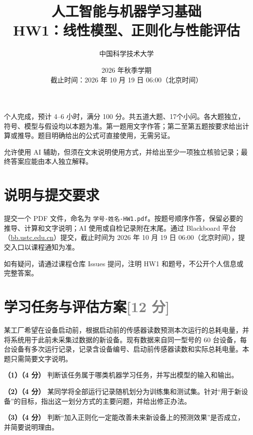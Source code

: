 \documentclass[11pt,a4paper]{article}
\title{\vspace{-0.8cm}\textbf{人工智能与机器学习基础\\HW1：线性模型、正则化与性能评估}}
\author{中国科学技术大学}
\date{2026 年秋季学期\\[0.3em]截止时间：2026 年 10 月 19 日 06:00（北京时间）}
\begin{document}
\maketitle
\thispagestyle{fancy}

\begin{importantbox}
个人完成，预计 4--6 小时，满分 100 分。共五道大题、17个小问。各大题独立，符号、模型与假设均以本题为准。第一题用文字作答；第二至第五题按要求给出计算或推导。题目明确给出的公式可直接使用，无需另证。

\end{importantbox}
允许使用 AI 辅助，但须在文末说明使用方式，并给出至少一项独立核验记录；最终答案应能由本人独立解释。


\section*{说明与提交要求}
提交一个 PDF 文件，命名为 {\small\texttt{学号-姓名-HW1.pdf}}。按题号顺序作答，保留必要的推导、计算和文字说明；AI 使用或自检记录附在末尾。通过 Blackboard 平台（\href{https://bb.ustc.edu.cn}{bb.ustc.edu.cn}）提交，截止时间为 2026 年 10 月 19 日 06:00（北京时间），提交入口以课程通知为准。

如有疑问，请通过课程仓库 Issues 提问，注明 HW1 和题号，不公开个人信息或完整答案。


\par\addvspace{1.2em}\noindent\begin{minipage}{\linewidth}
\section[学习任务与评估方案（12 分）]{学习任务与评估方案\hfill\textcolor{gray}{[12 分]}}
某工厂希望在设备启动前，根据启动前的传感器读数预测本次运行的总耗电量，并将系统用于此前未采集过数据的新设备。现有数据来自同一型号的 60 台设备，每台设备有多次运行记录，记录含设备编号、启动前传感器读数和实际总耗电量。本题只需简要文字说明。

\textbf{（1）（4 分）} 判断该任务属于哪类机器学习任务，并写出模型的输入和输出。

\textbf{（2）（4 分）} 某同学将全部运行记录随机划分为训练集和测试集。针对“用于新设备”的目标，指出这一划分方式的主要问题，并给出修正办法。

\textbf{（3）（4 分）} 判断“加入正则化一定能改善未来新设备上的预测效果”是否成立，并简要说明理由。


\end{minipage}\par
\end{document}

